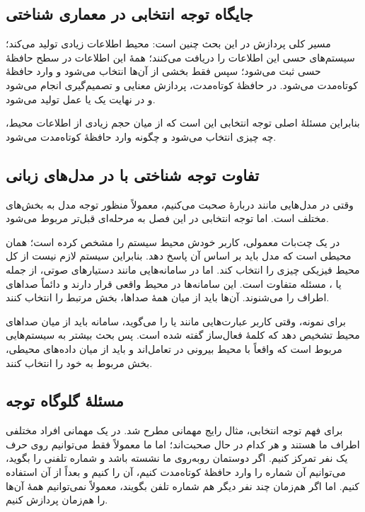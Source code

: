 \subsection{جایگاه توجه انتخابی در معماری شناختی}
مسیر کلی پردازش در این بحث چنین است: محیط اطلاعات زیادی تولید می‌کند؛ سیستم‌های حسی این اطلاعات را دریافت می‌کنند؛ همهٔ این اطلاعات در سطح حافظهٔ حسی ثبت می‌شود؛ سپس فقط بخشی از آن‌ها انتخاب می‌شود و وارد حافظهٔ کوتاه‌مدت می‌شود. در حافظهٔ کوتاه‌مدت، پردازش معنایی و تصمیم‌گیری انجام می‌شود و در نهایت یک  یا عمل تولید می‌شود.

بنابراین مسئلهٔ اصلی توجه انتخابی این است که از میان حجم زیادی از اطلاعات محیط، چه چیزی انتخاب می‌شود و چگونه وارد حافظهٔ کوتاه‌مدت می‌شود.

\subsection{تفاوت توجه شناختی با  در مدل‌های زبانی}
وقتی در مدل‌هایی مانند  دربارهٔ  صحبت می‌کنیم، معمولاً منظور توجه مدل به بخش‌های مختلف  است. اما توجه انتخابی در این فصل به مرحله‌ای قبل‌تر مربوط می‌شود.

در یک چت‌بات معمولی، کاربر خودش محیط سیستم را مشخص کرده است؛  همان محیطی است که مدل باید بر اساس آن پاسخ دهد. بنابراین سیستم لازم نیست از کل محیط فیزیکی چیزی را انتخاب کند. اما در سامانه‌هایی مانند دستیارهای صوتی، از جمله  یا ، مسئله متفاوت است. این سامانه‌ها در محیط واقعی قرار دارند و دائماً صداهای اطراف را می‌شنوند. آن‌ها باید از میان همهٔ صداها، بخش مرتبط را انتخاب کنند.

برای نمونه، وقتی کاربر عبارت‌هایی مانند  یا  را می‌گوید، سامانه باید از میان صداهای محیط تشخیص دهد که کلمهٔ فعال‌ساز گفته شده است. پس بحث  بیشتر به سیستم‌هایی مربوط است که واقعاً با محیط بیرونی در تعامل‌اند و باید از میان داده‌های محیطی، بخش مربوط به خود را انتخاب کنند.

\subsection{مسئلهٔ گلوگاه توجه}
برای فهم توجه انتخابی، مثال رایج مهمانی مطرح شد. در یک مهمانی افراد مختلفی اطراف ما هستند و هر کدام در حال صحبت‌اند؛ اما ما معمولاً فقط می‌توانیم روی حرف یک نفر تمرکز کنیم. اگر دوستمان روبه‌روی ما نشسته باشد و شماره تلفنی را بگوید، می‌توانیم آن شماره را وارد حافظهٔ کوتاه‌مدت کنیم، آن را  کنیم و بعداً از آن استفاده کنیم. اما اگر هم‌زمان چند نفر دیگر هم شماره تلفن بگویند، معمولاً نمی‌توانیم همهٔ آن‌ها را هم‌زمان پردازش کنیم.

